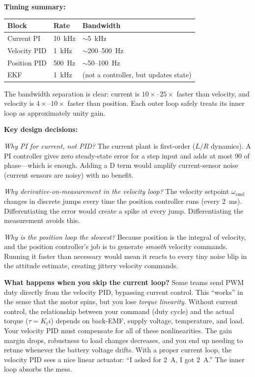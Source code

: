 \begin{mdframed}[linewidth=1pt, innertopmargin=10pt, innerbottommargin=10pt]
\textbf{Timing summary:}
\begin{center}
\begin{tabular}{l l l}
\hline
\textbf{Block} & \textbf{Rate} & \textbf{Bandwidth} \\
\hline
Current PI & 10~kHz & $\sim$5~kHz \\
Velocity PID & 1~kHz & $\sim$200--500~Hz \\
Position PID & 500~Hz & $\sim$50--100~Hz \\
EKF & 1~kHz & (not a controller, but updates state) \\
\hline
\end{tabular}
\end{center}

The bandwidth separation is clear: current is $10\times$--$25\times$ faster than velocity, and velocity is $4\times$--$10\times$ faster than position. Each outer loop safely treats its inner loop as approximately unity gain.

\textbf{Key design decisions:}

\textit{Why PI for current, not PID?} The current plant is first-order ($L/R$ dynamics). A PI controller gives zero steady-state error for a step input and adds at most 90\textdegree{} of phase---which is enough. Adding a D term would amplify current-sensor noise (current sensors are noisy) with no benefit.

\textit{Why derivative-on-measurement in the velocity loop?} The velocity setpoint $\omega_{\text{cmd}}$ changes in discrete jumps every time the position controller runs (every 2~ms). Differentiating the error would create a spike at every jump. Differentiating the measurement avoids this.

\textit{Why is the position loop the slowest?} Because position is the integral of velocity, and the position controller's job is to generate \textit{smooth} velocity commands. Running it faster than necessary would mean it reacts to every tiny noise blip in the attitude estimate, creating jittery velocity commands.

\textbf{What happens when you skip the current loop?} Some teams send PWM duty directly from the velocity PID, bypassing current control. This ``works'' in the sense that the motor spins, but you lose \textit{torque linearity}. Without current control, the relationship between your command (duty cycle) and the actual torque ($\tau = K_t i$) depends on back-EMF, supply voltage, temperature, and load. Your velocity PID must compensate for all of these nonlinearities. The gain margin drops, robustness to load changes decreases, and you end up needing to retune whenever the battery voltage drifts. With a proper current loop, the velocity PID sees a nice linear actuator: ``I asked for 2~A, I got 2~A.'' The inner loop absorbs the mess.


\end{mdframed}
